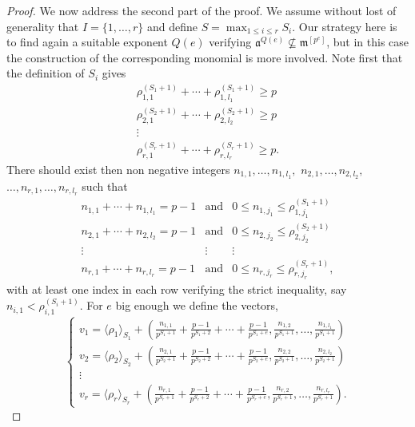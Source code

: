 \documentclass[12pt]{amsart}
\theoremstyle{definition}
\numberwithin{equation}{subsection}
\newcommand{\m}{\mathfrak{m}}
\newcommand{\fa}{\mathfrak{a}}
\renewcommand{\!}[1]{{\color{red}\text{\Huge$\star$ }#1}}
\begin{document}
\begin{proof}
	We now address the second part of the proof. We assume without lost of generality that $I=\{1,\ldots,r\}$ and define $S=\max_{1 \leq i \leq r}S_i$.  
	Our strategy here is to find again a suitable exponent $Q(e)$ verifying $\fa^{Q(e)} \nsubseteq  \m^{[p^{e}]}$, but in this case the construction of the corresponding monomial is more involved. Note first that the definition of $S_i$ gives
\begin{equation*}
\begin{matrix}
\rho_{1,1}^{(S_1+1)}+ \cdots + \rho_{1,l_1}^{(S_1+1)} \geq p\\
\rho_{2,1}^{(S_2+1)}+ \cdots + \rho_{2,l_2}^{(S_2+1)} \geq p\\
\vdots \\
\rho_{r,1}^{(S_r+1)}+ \cdots + \rho_{r,l_r}^{(S_r+1)} \geq p.
\end{matrix}
\end{equation*}
There should exist then non negative integers $n_{1,1}, \ldots, n_{1,l_1},$  $n_{2,1}, \ldots, n_{2,l_2},$ $\ldots, n_{r,1}, \ldots, n_{r,l_r}$ such that
\begin{equation*}
\begin{matrix}
n_{1,1}+ \cdots + n_{1,l_1} = p-1 &  \mathrm{and}& 0 \leq n_{1,j_1} \leq \rho_{1,j_1}^{(S_1+1)}\\
n_{2,1}+ \cdots + n_{2,l_2}= p-1 &  \mathrm{and}&0 \leq n_{2,j_2} \leq \rho_{2,j_2}^{(S_2+1)}\\
\vdots & \vdots & \vdots\\
n_{r,1}+ \cdots + n_{r,l_r} = p-1 &  \mathrm{and}& 0 \leq n_{r,j_r} \leq \rho_{r,j_r}^{(S_r+1)},
\end{matrix}
\end{equation*}
with at least one index in each row verifying the strict inequality, say $n_{i,1}<\rho_{i,1}^{(S_i+1)}$. 
For $e$ big enough we define the vectors, 
\[
\begin{cases}
		v_1=\langle \rho_1 \rangle_{S_1}+\left(\frac{n_{1,1}}{p^{S_1+1}}+\frac{p-1}{p^{S_1+2}}+ \cdots + \frac{p-1}{p^{S_1+e}},\frac{n_{1,2}}{p^{S_1+1}}, \ldots, \frac{n_{1,l_1}}{p^{S_1+1}} \right)\\
		v_2=\langle \rho_2 \rangle_{S_2}+\left(\frac{n_{2,1}}{p^{S_2+1}}+\frac{p-1}{p^{S_2+2}}+ \cdots + \frac{p-1}{p^{S_2+e}},\frac{n_{2,2}}{p^{S_2+1}}, \ldots, \frac{n_{2,l_2}}{p^{S_2+1}} \right)\\
         \vdots \\
		v_r=\langle \rho_r \rangle_{S_r}+\left(\frac{n_{r,1}}{p^{S_r+1}}+\frac{p-1}{p^{S_r+2}}+ \cdots + \frac{p-1}{p^{S_r+e}},\frac{n_{r,2}}{p^{S_r+1}}, \ldots, \frac{n_{r,l_r}}{p^{S_r+1}} \right).

\end{cases}\]
\end{proof}
\end{document}
